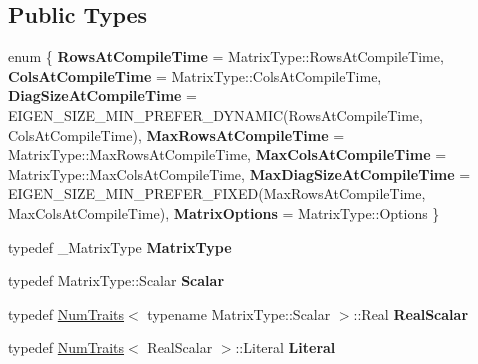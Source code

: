 \subsection*{Public Types}
\begin{DoxyCompactItemize}
\item 
\mbox{\label{class_eigen_1_1_b_d_c_s_v_d_a1b893b53559c840777a49142d32b75b7}} 
enum \{ \newline
{\bfseries Rows\+At\+Compile\+Time} = Matrix\+Type\+::Rows\+At\+Compile\+Time, 
{\bfseries Cols\+At\+Compile\+Time} = Matrix\+Type\+::Cols\+At\+Compile\+Time, 
{\bfseries Diag\+Size\+At\+Compile\+Time} = E\+I\+G\+E\+N\+\_\+\+S\+I\+Z\+E\+\_\+\+M\+I\+N\+\_\+\+P\+R\+E\+F\+E\+R\+\_\+\+D\+Y\+N\+A\+M\+IC(Rows\+At\+Compile\+Time, Cols\+At\+Compile\+Time), 
{\bfseries Max\+Rows\+At\+Compile\+Time} = Matrix\+Type\+::Max\+Rows\+At\+Compile\+Time, 
\newline
{\bfseries Max\+Cols\+At\+Compile\+Time} = Matrix\+Type\+::Max\+Cols\+At\+Compile\+Time, 
{\bfseries Max\+Diag\+Size\+At\+Compile\+Time} = E\+I\+G\+E\+N\+\_\+\+S\+I\+Z\+E\+\_\+\+M\+I\+N\+\_\+\+P\+R\+E\+F\+E\+R\+\_\+\+F\+I\+X\+ED(Max\+Rows\+At\+Compile\+Time, Max\+Cols\+At\+Compile\+Time), 
{\bfseries Matrix\+Options} = Matrix\+Type\+::Options
 \}
\item 
\mbox{\label{class_eigen_1_1_b_d_c_s_v_d_a8c3310eee662af4ca2428f7afd1472ed}} 
typedef \+\_\+\+Matrix\+Type {\bfseries Matrix\+Type}
\item 
\mbox{\label{class_eigen_1_1_b_d_c_s_v_d_aaeab2cfc3f87e2a2c595a9d5b4d97c71}} 
typedef Matrix\+Type\+::\+Scalar {\bfseries Scalar}
\item 
\mbox{\label{class_eigen_1_1_b_d_c_s_v_d_a2eb49279d7a1760eed1346fb8a0da629}} 
typedef \mbox{\hyperlink{struct_eigen_1_1_num_traits}{Num\+Traits}}$<$ typename Matrix\+Type\+::\+Scalar $>$\+::Real {\bfseries Real\+Scalar}
\item 
\mbox{\label{class_eigen_1_1_b_d_c_s_v_d_aad17038f9628ce5ed6e1461a67cd3a03}} 
typedef \mbox{\hyperlink{struct_eigen_1_1_num_traits}{Num\+Traits}}$<$ Real\+Scalar $>$\+::Literal {\bfseries Literal}
\item 
\mbox{\label{class_eigen_1_1_b_d_c_s_v_d_a4c38005126c75b1ba3b1b95117b4546d}} 

\end{DoxyCompactItemize}
